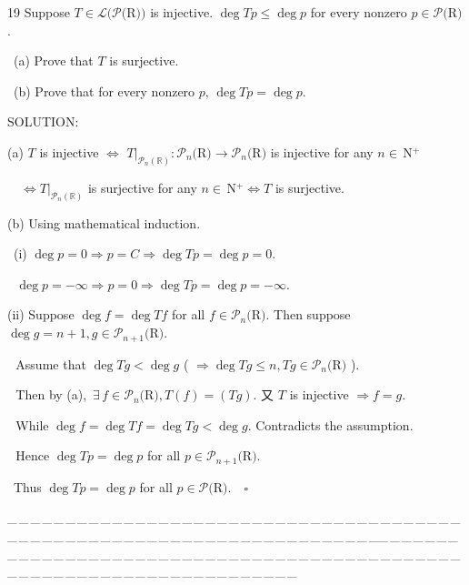 \documentclass[a4paper, 11pt, UTF8]{article}
\def\Lm{\mathcal{L}}
\def\Po{\mathcal{P}}
\def\Rbb{\mathbb{R}}
\def\Nbp{$\,{\timesbf N}$^+}
\begin{document}
\begin{large}
{\timesbf\Large 19} {\timessl\Large 
Suppose $T\in\Lm(\Po(${\timesbf R}$))$ is injective. $\deg Tp\leq\deg p$ for every nonzero $p\in\Po(${\timesbf R}$)$.
}\par\quad\,
(a) {\timessl\Large Prove that $T$ is surjective.}\par\quad\,
(b) {\timessl\Large Prove that for every nonzero $p$, $\deg Tp=\deg p$.}\par
{\timesbf S\footnotesize{OLUTION:}}\par\quad
(a) $T$ is injective $\Longleftrightarrow$ $T|_{\Po_n(\Rbb)}:\Po_n(${\timesbf R}$)\rightarrow \Po_n(${\timesbf R}$)$ is injective for any $n\in\Nbp$\par\qquad\qquad\qquad\quad\,\,\,\,
$\Longleftrightarrow T|_{\Po_n(\Rbb)}$ is surjective for any $n\in\Nbp\Longleftrightarrow T$ is surjective.\par\quad
(b) Using mathematical induction.\par\qquad\,
(i) $\deg p=0\Rightarrow p=C\Rightarrow\deg Tp=\deg p=0.$\par\qquad\quad\,\,
$\deg p=-\infty\Rightarrow p=0\Rightarrow\deg Tp=\deg p=-\infty.$\par\qquad
(ii) Suppose $\deg f=\deg Tf$ for all $f\in\Po_{n}(${\timesbf R}$).$ Then suppose $\deg g=n+1,g\in\Po_{n+1}(${\timesbf R}$)$.\par\qquad\quad\,\,
Assume that $\deg Tg<\deg g$ ( $\Rightarrow\deg Tg\leq n,Tg\in\Po_{n}(${\timesbf R}$)$ ).\par\qquad\quad\,\,
Then by (a), \,$\exists\,f\in\Po_{n}(${\timesbf R}$),T(f)=(Tg).$ 又 $T$ is injective $\Rightarrow f=g$.\par\qquad\quad\,\,
While $\deg f=\deg Tf=\deg Tg<\deg g$. Contradicts the assumption.\par\qquad\quad\,\,
Hence $\deg Tp=\deg p$ for all $p\in\Po_{n+1}(${\timesbf R}$)$.\par\qquad\,
Thus $\deg Tp=\deg p$ for all $p\in\Po(${\timesbf R}$).\quad\square$
\par
{\tiny \_\,\_\,\_\,\_\,\_\,\_\,\_\,\_\,\_\,\_\,\_\,\_\,\_\,\_\,\_\,\_\,\_\,\_\,\_\,\_\,\_\,\_\,\_\,\_\,\_\,\_\,\_\,\_\,\_\,\_\,\_\,\_\,\_\,\_\,\_\,\_\,\_\,\_\,\_\,\_\,\_\,\_\,\_\,\_\,\_\,\_\,\_\,\_\,\_\,\_\,\_\,\_\,\_\,\_\,\_\,\_\,\_\,\_\,\_\,\_\,\_\,\_\,\_\,\_\,\_\,\_\,\_\,\_\,\_\,\_\,\_\_\,\_\,\_\,\_\,\_\,\_\,\_\,\_\,\_\,\_\,\_\,\_\,\_\,\_\,\_\,\_\,\_\,\_\,\_\,\_\,\_\,\_\,\_\,\_\,\_\,\_\,\_\,\_\,\_\,\_\,\_\,\_\,\_\,\_\,\_\,\_\,\_\,\_\,\_\,\_\,\_\,\_\,\_\,\_\,\_\,\_\,\_\,\_\,\_\,\_\,\_\,\_\,\_\,\_\,\_\,\_\,\_\,\_\,\_\,\_\,\_\,\_\,\_\,\_\,\_\,\_\,\_\,\_\,\_\,\_\,\_}\par


\end{large}
\end{document}
